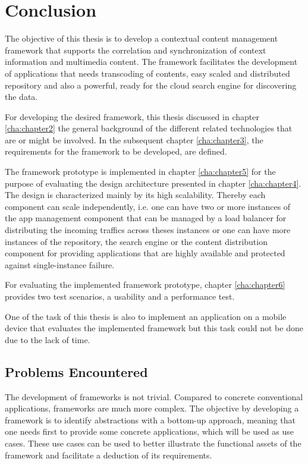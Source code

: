\chapter{Conclusion\label{cha:chapter7}}
The objective of this thesis is to develop a contextual content management framework that supports the correlation and synchronization of context information and multimedia content. The framework facilitates the development of applications that needs transcoding of contents, easy scaled and distributed repository and also a powerful, ready for the cloud search engine for discovering the data. 

For developing the desired framework, this thesis discussed in chapter \ref{cha:chapter2} the general background of the different related technologies that are or might be involved. In the subsequent chapter \ref{cha:chapter3}, the requirements for the framework to be developed, are defined.

The framework prototype is implemented in chapter \ref{cha:chapter5} for the purpose of evaluating the design architecture presented in chapter \ref{cha:chapter4}. The design is characterized mainly by its high scalability. Thereby each component can scale independently, i.e. one can have two or more instances of the app management component that can be managed by a load balancer for distributing the incoming traffics across theses instances or one can have more instances of the repository, the search engine or the content distribution component for providing applications that are highly available and protected against single-instance failure.

For evaluating the implemented framework prototype, chapter \ref{cha:chapter6} provides two test scenarios, a usability and a performance test.

One of the task of this thesis is also to implement an application on a mobile device that evaluates the implemented framework but this task could not be done due to the lack of time.
 
\section{Problems Encountered}
The development of frameworks is not trivial. Compared to concrete conventional applications, frameworks are much more complex. The objective by developing a framework is to identify abstractions with a bottom-up approach, meaning that one needs first to provide some concrete applications, which will be used as use cases. These use cases can be used to better illustrate the functional assets of the framework and facilitate a deduction of its requirements.

